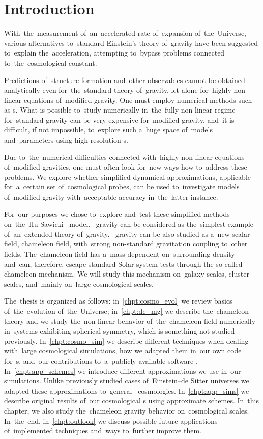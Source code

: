 \chapter{Introduction}
With~the~measurement of~an~accelerated rate of~expansion of~the~Universe, various alternatives to~standard Einstein's theory of~gravity have been suggested to~explain the~acceleration, attempting to~bypass problems connected to~the~cosmological constant.

Predictions of~structure formation and~other observables cannot be obtained analytically even for~the~standard theory of~gravity, let alone for~highly non-linear equations of~modified gravity. One must employ numerical methods such as \nbodysim s. What is possible to~study numerically in~the~fully non-linear regime for~standard gravity can be very expensive for~modified gravity, and~it is difficult, if not impossible, to~explore such a~huge space of~models and~parameters using high-resolution \nbodysim s.

Due to~the~numerical difficulties connected with~highly non-linear equations of~modified gravities, one must often look for~new ways how to~address these problems. We explore whether simplified dynamical approximations, applicable for~a~certain set of~cosmological probes, can be used to~investigate models of~modified gravity with~acceptable accuracy in~the~latter instance.

For~our purposes we chose to~explore and~test these simplified methods on~the~Hu-Sawicki \fR\ model. \fR\ gravity can be considered as the~simplest example of~an~extended theory of~gravity. \fR\ gravity can be also studied as a~new scalar field, chameleon field, with~strong non-standard gravitation coupling to~other fields. The~chameleon field has a~mass-dependent on~surrounding density and~can, therefore, escape standard Solar system tests through the so-called chameleon mechanism. We will study this mechanism on~galaxy scales, cluster scales, and~mainly on~large cosmological scales.

The~thesis is organized as follows: in~\autoref{chpt:cosmo_evol} we review basics of~the~evolution of~the~Universe; in~\autoref{chpt:de_mg} we describe the~chameleon theory and we study the~non-linear behavior of~the~chameleon field numerically in~systems exhibiting spherical symmetry, which is something not studied previously. In~\autoref{chpt:cosmo_sim} we describe different techniques when dealing with~large cosmological simulations, how we adapted them in~our own code for~\nbodysim s, and~our contributions to~a~publicly available software . In~\autoref{chpt:app_schemes} we introduce different approximations we use in~our simulations. Unlike previously studied cases of~Einstein--de Sitter universes we adapted these approximations to~general \LCDM\ cosmologies. In~\autoref{chpt:app_sims} we describe original results of~our cosmological \nbodysim s using approximate schemes. In~this chapter, we also study the~chameleon gravity behavior on~cosmological scales. %
In~the~end, in~\autoref{chpt:outlook} we discuss possible future applications of~implemented techniques and~ways to~further improve them.
